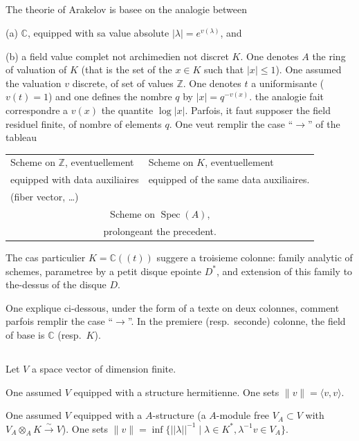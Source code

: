 \documentclass[12pt,a4paper]{article}
\theoremstyle{plain}
\theoremstyle{definition}
\DeclareMathOperator{\Spec}{Spec}
\newcommand{\ZZ}{\mathbb{Z}}
\newcommand{\CC}{\mathbb{C}}
\begin{document}
\subsection{}

The theorie of Arakelov is basee on the analogie between

(a) $\CC$, equipped with sa value absolute $|\lambda| = e^{v(\lambda)}$, and

(b) a field value complet not archimedien not discret $K$. One denotes $A$ the ring
of valuation of $K$ (that is the set of the $x \in K$ such that $|x| \leq 1$).
One assumed the valuation $v$ discrete, of set of values $\ZZ$. One denotes $t$
a uniformisante ($v(t) = 1$) and one defines the nombre $q$ by $|x| = q^{-v(x)}$.
the analogie fait correspondre a $v(x)$ the quantite $\log |x|$. Parfois, it faut
supposer the field residuel finite, of nombre of elements $q$. One veut remplir the
case ``$\to$'' of the tableau

\begin{center}
\begin{tabular}{p{6cm}|p{6cm}}
Scheme on $\ZZ$, eventuellement & Scheme on $K$, eventuellement \\
equipped with data auxiliaires & equipped of the same data auxiliaires.\\
(fiber vector, \ldots) & \\
\hline
\multicolumn{2}{c}{Scheme on $\Spec(A)$,} \\
\multicolumn{2}{c}{prolongeant the precedent.}
\end{tabular}
\end{center}

The cas particulier $K = \CC((t))$ suggere a troisieme colonne: family analytic
of schemes, parametree by a petit disque epointe $D^*$, and extension of this
family to the-dessus of the disque $D$.

One explique ci-dessous, under the form of a texte on deux colonnes, comment
parfois remplir the case ``$\to$''. In the premiere (resp.\ seconde) colonne, the field
of base is $\CC$ (resp.\ $K$).

\subsection{}

Let $V$ a space vector of dimension finite.

\smallskip

\begin{minipage}[t]{0.48\textwidth}
One assumed $V$ equipped with a
structure hermitienne. One sets
$\|v\| = \langle v,v \rangle$.
\end{minipage}
\hfill
\begin{minipage}[t]{0.48\textwidth}
One assumed $V$ equipped with a
$A$-structure (a $A$-module free
$V_A \subset V$ with $V_A \otimes_A K \xrightarrow{\sim} V$). One sets $\|v\| = \inf\{||\lambda||^{-1} \mid \lambda \in K^*, \lambda^{-1}v \in V_A\}$.
\end{minipage}
\end{document}
